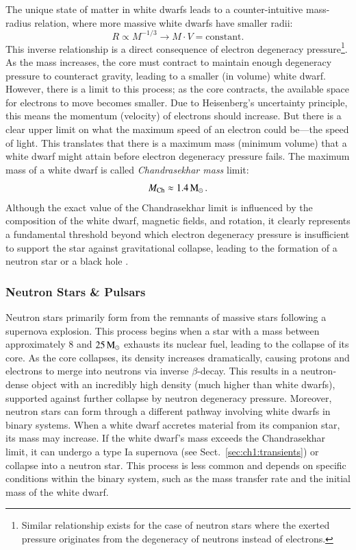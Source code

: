 \documentclass[main.tex]{subfiles}
\begin{document}
    The unique state of matter in white dwarfs leads to a counter-intuitive mass-radius relation, where more massive white dwarfs have smaller radii:
    \begin{equation}\label{eq:m-r_wd}
        R \propto M^{-1/3} \longrightarrow M\cdot V = \text{constant.}
    \end{equation}
    This inverse relationship is a direct consequence of electron degeneracy pressure\footnote{Similar relationship exists for the case of neutron stars where the exerted pressure originates from the degeneracy of neutrons instead of electrons.}. As the mass increases, the core must contract to maintain enough degeneracy pressure to counteract gravity, leading to a smaller (in volume) white dwarf. However, there is a limit to this process; as the core contracts, the available space for electrons to move becomes smaller. Due to Heisenberg's uncertainty principle, this means the momentum (velocity) of electrons should increase. But there is a clear upper limit on what the maximum speed of an electron could be---the speed of light. This translates that there is a maximum mass (minimum volume) that a white dwarf might attain before electron degeneracy pressure fails. The maximum mass of a white dwarf is called \textit{Chandrasekhar mass} limit:
    \begin{equation}\label{eq:chandra_limit}
        M_\mathrm{Ch} \approx 1.4\mathrm{\,M_\odot}\,.
    \end{equation}
    Although the exact value of the Chandrasekhar limit is influenced by the composition of the white dwarf, magnetic fields, and rotation, it clearly represents a fundamental threshold beyond which electron degeneracy pressure is insufficient to support the star against gravitational collapse, leading to the formation of a neutron star or a black hole \citep[for a more extensive overview of white dwarfs we refer to ][]{blouin2024}.


    \subsubsection{Neutron Stars \& Pulsars}
    Neutron stars primarily form from the remnants of massive stars following a supernova explosion. This process begins when a star with a mass between approximately $8$ and $25\mathrm{\,M_\odot}$ exhausts its nuclear fuel, leading to the collapse of its core. As the core collapses, its density increases dramatically, causing protons and electrons to merge into neutrons via inverse $\beta$-decay. This results in a neutron-dense object with an incredibly high density (much higher than white dwarfs), supported against further collapse by neutron degeneracy pressure. 
    Moreover, neutron stars can form through a different pathway involving white dwarfs in binary systems. When a white dwarf accretes material from its companion star, its mass may increase. If the white dwarf's mass exceeds the Chandrasekhar limit, it can undergo a type Ia supernova (see Sect.~\ref{sec:ch1:transients}) or collapse into a neutron star. This process is less common and depends on specific conditions within the binary system, such as the mass transfer rate and the initial mass of the white dwarf.
\end{document}
